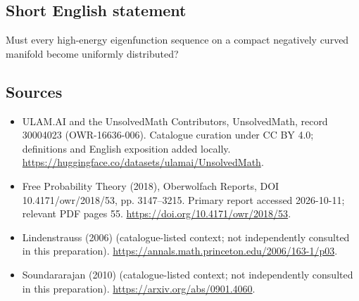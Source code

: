 \documentclass[11pt]{article}
\begin{document}
\subsection{Short English statement}
Must every high-energy eigenfunction sequence on a compact negatively curved manifold become uniformly distributed?
\subsection{Sources}
\begin{itemize}
\item[\hypertarget{source:30004023:1}{S1}] ULAM.AI and the UnsolvedMath Contributors, UnsolvedMath, record 30004023 (OWR-16636-006). Catalogue curation under CC BY 4.0; definitions and English exposition added locally.
\url{https://huggingface.co/datasets/ulamai/UnsolvedMath}.
\item[\hypertarget{source:30004023:2}{S2}] Free Probability Theory (2018), Oberwolfach Reports, DOI 10.4171/owr/2018/53, pp. 3147--3215. Primary report accessed 2026-10-11; relevant PDF pages 55.
\url{https://doi.org/10.4171/owr/2018/53}.
\item[\hypertarget{source:30004023:3}{S3}] Lindenstrauss (2006) (catalogue-listed context; not independently consulted in this preparation).
\url{https://annals.math.princeton.edu/2006/163-1/p03}.
\item[\hypertarget{source:30004023:4}{S4}] Soundararajan (2010) (catalogue-listed context; not independently consulted in this preparation).
\url{https://arxiv.org/abs/0901.4060}.
\end{itemize}
\label{end:30004023}
\end{document}
